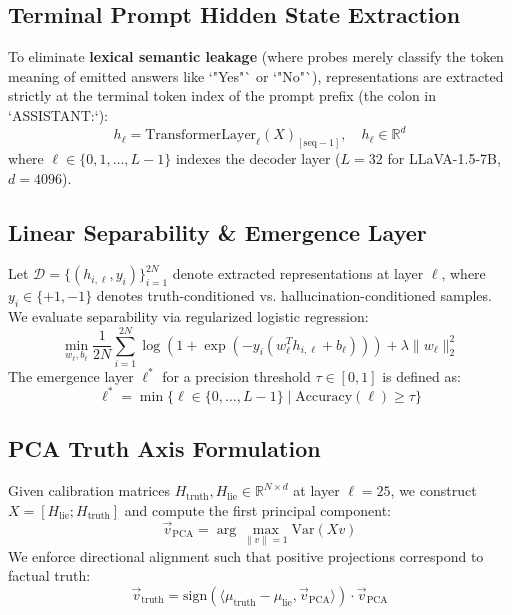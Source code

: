 \documentclass[11pt]{article}
\begin{document}
\subsection{Terminal Prompt Hidden State Extraction}
To eliminate \textbf{lexical semantic leakage} (where probes merely classify the token meaning of emitted answers like `"Yes"` or `"No"`), representations are extracted strictly at the terminal token index of the prompt prefix (the colon in `ASSISTANT:`):
\begin{equation}
h_{\ell} = \text{TransformerLayer}_{\ell}(X)_{[\text{seq}-1]}, \quad h_{\ell} \in \mathbb{R}^{d}
\end{equation}
where $\ell \in \{0, 1, \dots, L-1\}$ indexes the decoder layer ($L=32$ for LLaVA-1.5-7B, $d=4096$).

\subsection{Linear Separability \& Emergence Layer}
Let $\mathcal{D} = \{(h_{i, \ell}, y_i)\}_{i=1}^{2N}$ denote extracted representations at layer $\ell$, where $y_i \in \{+1, -1\}$ denotes truth-conditioned vs. hallucination-conditioned samples. We evaluate separability via regularized logistic regression:
\begin{equation}
\min_{w_{\ell}, b_{\ell}} \frac{1}{2N} \sum_{i=1}^{2N} \log\left(1 + \exp\left(-y_i (w_{\ell}^T h_{i, \ell} + b_{\ell})\right)\right) + \lambda \|w_{\ell}\|_2^2
\end{equation}
The emergence layer $\ell^*$ for a precision threshold $\tau \in [0, 1]$ is defined as:
\begin{equation}
\ell^* = \min \{ \ell \in \{0, \dots, L-1\} \mid \text{Accuracy}(\ell) \ge \tau \}
\end{equation}

\subsection{PCA Truth Axis Formulation}
Given calibration matrices $H_{\text{truth}}, H_{\text{lie}} \in \mathbb{R}^{N \times d}$ at layer $\ell = 25$, we construct $X = [H_{\text{lie}}; H_{\text{truth}}]$ and compute the first principal component:
\begin{equation}
\vec{v}_{\text{PCA}} = \arg\max_{\|v\|=1} \text{Var}(Xv)
\end{equation}
We enforce directional alignment such that positive projections correspond to factual truth:
\begin{equation}
\vec{v}_{\text{truth}} = \text{sign}\left(\langle \mu_{\text{truth}} - \mu_{\text{lie}}, \vec{v}_{\text{PCA}} \rangle\right) \cdot \vec{v}_{\text{PCA}}
\end{equation}
\end{document}
